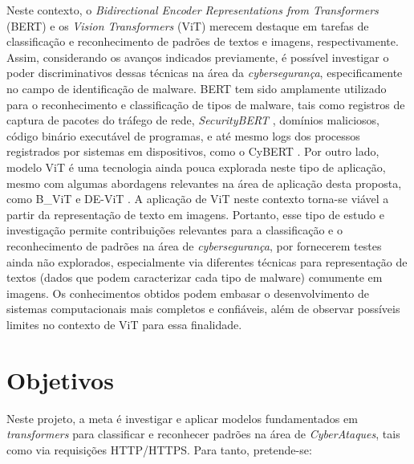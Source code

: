    Neste contexto, o \textit{Bidirectional Encoder Representations from Transformers} (BERT) e os \textit{Vision Transformers} (ViT) merecem destaque em tarefas de classificação e reconhecimento de padrões de textos e imagens, respectivamente. Assim, considerando os avanços indicados previamente, é possível investigar o poder discriminativos dessas técnicas na área da \textit{cybersegurança}, especificamente no campo de identificação de malware. BERT tem sido amplamente utilizado para o reconhecimento e classificação de tipos de malware, tais como registros de captura de pacotes do tráfego de rede, \textit{SecurityBERT} \cite{ferrag2024revolutionizing}, domínios maliciosos, código binário executável de programas, e até mesmo logs dos processos registrados por sistemas em dispositivos, como o CyBERT \cite{ranade2021cybert}. Por outro lado, modelo ViT é uma tecnologia ainda pouca explorada neste tipo de aplicação, mesmo com algumas abordagens relevantes na área de aplicação desta proposta, como B\_ViT \cite{belal2023global} e DE-ViT \cite{he2024network}. A aplicação de ViT neste contexto torna-se viável a partir da representação de texto em imagens. Portanto, esse tipo de estudo e investigação permite contribuições relevantes para a classificação e o reconhecimento de padrões na área de \textit{cybersegurança}, por fornecerem testes ainda não explorados, especialmente via diferentes técnicas para representação de textos (dados que podem caracterizar cada tipo de malware) comumente  em imagens. Os conhecimentos obtidos podem embasar o desenvolvimento de sistemas computacionais mais completos e confiáveis, além de observar possíveis limites no contexto de ViT para essa finalidade.
   

\section{Objetivos}

Neste projeto, a meta é investigar e aplicar modelos fundamentados em \textit{transformers} para classificar e reconhecer padrões na área de \textit{CyberAtaques}, tais como via requisições HTTP/HTTPS. Para tanto, pretende-se:

